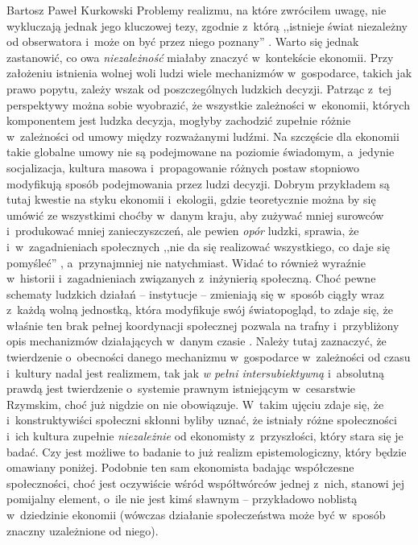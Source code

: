 \begin{artplenv}{Bartosz Paweł Kurkowski}
Problemy realizmu, na które zwróciłem uwagę, nie wykluczają jednak jego kluczowej tezy, zgodnie z~którą ,,istnieje świat
niezależny od obserwatora i~może on być przez niego poznany''
\parencite[s.~16]{hardt_studia_2013}.
Warto się
jednak zastanowić, co owa \textit{niezależność} miałaby znaczyć w~kontekście ekonomii. Przy założeniu istnienia wolnej
woli ludzi wiele mechanizmów w~gospodarce, takich jak prawo popytu, zależy wszak od poszczególnych ludzkich decyzji.
Patrząc z~tej perspektywy można sobie wyobrazić, że wszystkie zależności w~ekonomii, których komponentem jest ludzka
decyzja, mogłyby zachodzić zupełnie różnie w~zależności od umowy między rozważanymi ludźmi. Na szczęście dla ekonomii
takie globalne umowy nie są podejmowane na poziomie świadomym, a~jedynie socjalizacja, kultura masowa i~propagowanie
różnych postaw stopniowo modyfikują sposób podejmowania przez ludzi decyzji. Dobrym przykładem są tutaj kwestie na
styku ekonomii i~ekologii, gdzie teoretycznie można by się umówić ze wszystkimi choćby w~danym kraju, aby zużywać mniej
surowców i~produkować mniej zanieczyszczeń, ale pewien \textit{opór} ludzki, sprawia, że i~w~zagadnieniach społecznych
,,nie da się realizować wszystkiego, co daje się pomyśleć''
\parencite[s.~42]{zboron_teorie_2009},
a~przynajmniej nie natychmiast. Widać to również wyraźnie w~historii i~zagadnieniach związanych z~inżynierią społeczną.
Choć pewne schematy ludzkich działań -- instytucje -- zmieniają się w~sposób ciągły wraz z~każdą wolną jednostką, która
modyfikuje swój światopogląd, to zdaje się, że właśnie ten brak pełnej koordynacji społecznej pozwala na
trafny i~przybliżony opis mechanizmów działających w~danym czasie
\parencite[s.~21]{hardt_studia_2013}.
Należy
tutaj zaznaczyć, że twierdzenie o~obecności danego mechanizmu w~gospodarce w~zależności od czasu i~kultury nadal jest
realizmem, tak jak \textit{w pełni intersubiektywną} i~absolutną prawdą jest twierdzenie o~systemie prawnym istniejącym
w~cesarstwie Rzymskim, choć już nigdzie on nie obowiązuje. W~takim ujęciu zdaje się, że i~konstruktywiści społeczni
skłonni byliby uznać, że istniały różne społeczności i~ich kultura zupełnie \textit{niezależnie} od
ekonomisty z~przyszłości, który stara się je badać. Czy jest możliwe to badanie to już realizm epistemologiczny, który będzie
omawiany poniżej. Podobnie ten sam ekonomista badając współczesne społeczności, choć jest oczywiście wśród współtwórców
jednej z~nich, stanowi jej pomijalny element, o~ile nie jest kimś sławnym -- przykładowo noblistą w~dziedzinie ekonomii
(wówczas działanie społeczeństwa może być w~sposób znaczny uzależnione od niego).



\end{artplenv}
